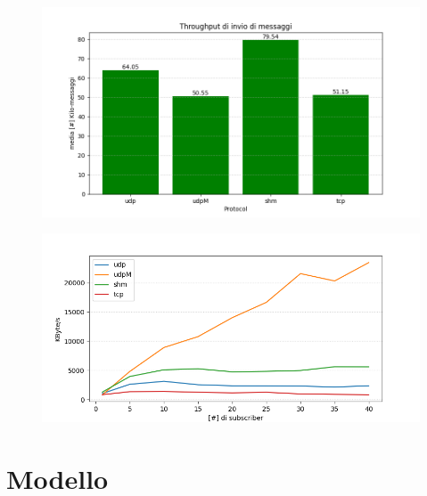 \begin{figure}[H]
    \includegraphics[width=\textwidth]{./results/test3_throughput_m.png} 
        \caption{} %
        \label{}
\end{figure}


\begin{figure}[H]
    \includegraphics[width=\textwidth]{./results/test3_graph_throughput.png} 
    \caption{} %
    \label{}
\end{figure}






\section{Modello}